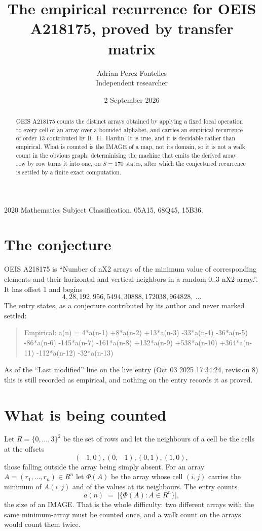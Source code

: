 \documentclass[11pt,a4paper]{article}
\title{The empirical recurrence for OEIS A218175, proved by transfer matrix}
\author{Adrian Perez Fontelles\\ \small Independent researcher}
\date{2 September 2026}
\theoremstyle{plain}
\theoremstyle{definition}
\begin{document}
\maketitle

\begin{abstract}
OEIS A218175 counts the distinct arrays obtained by applying a fixed local operation to every cell
of an array over a bounded alphabet, and carries an empirical recurrence of order $13$
contributed by R.~H.~Hardin. It is true, and it is decidable rather than empirical. What is
counted is the IMAGE of a map, not its domain, so it is not a walk count in the obvious graph;
determinising the machine that emits the derived array row by row turns it into one, on
$S=170$ states, after which the conjectured recurrence is settled by a finite exact
computation.
\end{abstract}

\noindent\small 2020 Mathematics Subject Classification. 05A15, 68Q45, 15B36.\normalsize

\section{The conjecture}

OEIS A218175 is ``Number of nX2 arrays of the minimum value of corresponding elements and their horizontal and vertical neighbors in a random 0..3 nX2 array.''. It has offset $1$ and begins
\[
4, 28, 192, 956, 5494, 30888, 172038, 964828,\ \dots
\]
The entry states, as a conjecture contributed by its author and never marked settled:
\begin{quote}
Empirical: a(n) = 4*a(n-1) +8*a(n-2) +13*a(n-3) -33*a(n-4) -36*a(n-5) -86*a(n-6) -145*a(n-7) -161*a(n-8) +132*a(n-9) +538*a(n-10) +364*a(n-11) -112*a(n-12) -32*a(n-13)
\end{quote}
As of the ``Last modified'' line on the live entry (Oct 03 2025 17:34:24, revision 8) this is still
recorded as empirical, and nothing on the entry records it as proved.

\section{What is being counted}

Let $R=\{0,\dots,3\}^{2}$ be the set of rows and let the neighbours of
a cell be the cells at the offsets
\[
(-1,0), (0,-1), (0,1), (1,0),
\]
those falling outside the array being simply absent. For an array
$A=(r_1,\dots,r_n)\in R^n$ let $\Phi(A)$ be the array whose cell $(i,j)$ carries the
minimum of $A(i,j)$ and of the values at its neighbours. The entry counts
\[
a(n)\;=\;\bigl|\{\Phi(A):A\in R^n\}\bigr| ,
\]
the size of an IMAGE. That is the whole difficulty: two different arrays with the same
minimum-array must be counted once, and a walk count on the arrays would count them twice.
\end{document}
